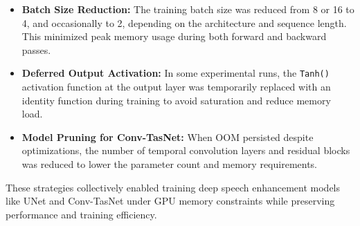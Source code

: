 \begin{itemize}
    \item \textbf{Batch Size Reduction:} The training batch size was reduced from 8 or 16 to 4, and occasionally to 2, depending on the architecture and sequence length. This minimized peak memory usage during both forward and backward passes.

    \item \textbf{Deferred Output Activation:} In some experimental runs, the \texttt{Tanh()} activation function at the output layer was temporarily replaced with an identity function during training to avoid saturation and reduce memory load.

    \item \textbf{Model Pruning for Conv-TasNet:} When OOM persisted despite optimizations, the number of temporal convolution layers and residual blocks was reduced to lower the parameter count and memory requirements.
\end{itemize}

These strategies collectively enabled training deep speech enhancement models like UNet and Conv-TasNet under GPU memory constraints while preserving performance and training efficiency.

